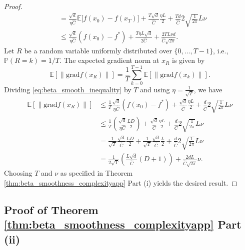 \documentclass{article}
\newcommand{\rgrad}{\mathrm{grad}}
\newcommand{\pert}{\nu}
\theoremstyle{plain}
\theoremstyle{definition}
\theoremstyle{remark}
\begin{document}
\begin{proof}
\begin{equation}
\begin{aligned}
    &= \frac{\sqrt{d}}{\eta \hat{C} }\mathbb{E}\bigl[f(x_0)-f(x_{T})\bigr] + \frac{T\sqrt{d}}{\hat{C}}\frac{\eta{L}}{2}+\frac{Td}{\hat{C}}2\sqrt{\frac{1}{2\pi}}{L}\pert\\
    &\leq \frac{\sqrt{d}}{\eta \hat{C} }(f(x_0)-f^*) + \frac{T\eta{L}\sqrt{d}}{2\hat{C}}+\frac{2T{L}\pert d}{\hat{C}\sqrt{2\pi}}.
\end{aligned}
\end{equation}
Let $R$ be a random variable uniformly distributed over $\{0, \dots, T-1\}$, i.e., $\mathbb{P}(R=k) = 1/T$. The expected gradient norm at $x_R$ is given by
\[
\mathbb{E}[\|\rgrad f(x_R)\|] = \frac{1}{T} \sum_{k=0}^{T-1} \mathbb{E}[\|\rgrad f(x_k)\|].
\]
Dividing \eqref{eq:beta_smooth_inequality} by $T$ and using $\eta = \frac{1}{\sqrt{T}}$, we have
\begin{align*}
    \mathbb{E}\left[\|\rgrad f(x_R)\| \right]
    &\leq \frac{1}{T}\frac{\sqrt{d}}{\eta \hat{C} }(f(x_0)-f^*) + \frac{\sqrt{d}}{\hat{C}}\frac{\eta{L}}{2}+\frac{d}{\hat{C}}2\sqrt{\frac{1}{2\pi}}{L}\pert\\
    &{\leq}  \frac{1}{T}\left(\frac{\sqrt{d}}{\eta \hat{C} }\frac{{L} D}{2}\right) + \frac{\sqrt{d}}{\hat{C}}\frac{\eta{L}}{2}+\frac{d}{\hat{C}}2\sqrt{\frac{1}{2\pi}}{L}\pert\\
    &= \frac{1}{\sqrt{T}}\frac{\sqrt{d}}{\hat{C}}\frac{{L}D}{2} + \frac{1}{\sqrt{T}}\frac{\sqrt{d}}{\hat{C}}\frac{{L}}{2}+\frac{d}{\hat{C}}2\sqrt{\frac{1}{2\pi}}{L}\pert\\
    &= \frac{1}{2\sqrt{T}}\left(\frac{{L}\sqrt{d}}{\hat{C}} (D+1)\right)+\frac{2dL}{\hat{C}\sqrt{2\pi}}\pert.
\end{align*}
Choosing $T$ and $\pert$ as specified in Theorem \ref{thm:beta_smoothness_complexityapp} Part (i) yields the desired result.
\end{proof}





\subsection{Proof of Theorem \ref{thm:beta_smoothness_complexityapp} Part (ii)}\label{pf:beta_smoothness_complexity_cosine}
\end{document}
